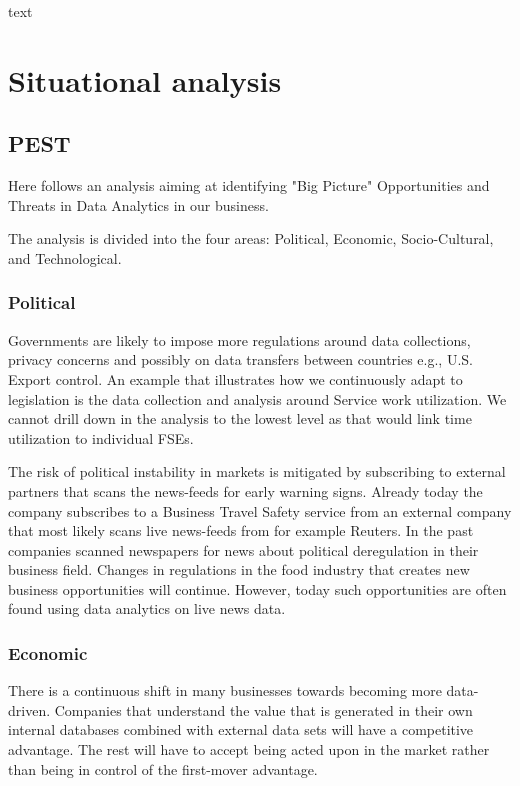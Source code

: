 \documentclass[10pt]{article} %
\begin{document}
text

\section{Situational analysis}
\subsection{PEST}
Here follows an analysis aiming at identifying "Big Picture" Opportunities and Threats in Data Analytics in our business. 

The analysis is divided into the four areas: Political, Economic, Socio-Cultural, and Technological.

\subsubsection{Political}
Governments are likely to impose more regulations around data collections, privacy concerns and possibly on data transfers between countries e.g., U.S. Export control.
An example that illustrates how we continuously adapt to legislation is the data collection and analysis around Service work utilization. We cannot drill down in the analysis to the lowest level as that would link time utilization to individual FSEs.

The risk of political instability in markets is mitigated by subscribing to external partners that scans the news-feeds for early warning signs. Already today the company subscribes to a Business Travel Safety service from an external company that most likely scans live news-feeds from for example Reuters. In the past companies scanned newspapers for news about political deregulation in their business field. Changes in regulations in the food industry that creates new business opportunities will continue. However, today such opportunities are often found using data analytics on live news data.

\subsubsection{Economic}
There is a continuous shift in many businesses towards becoming more data-driven. Companies that understand the value that is generated in their own internal databases combined with external data sets will have a competitive advantage. The rest will have to accept being acted upon in the market rather than being in control of the first-mover advantage.
\end{document}
